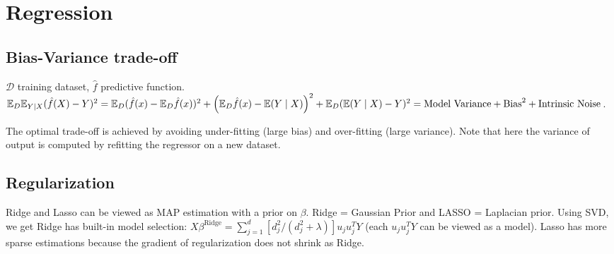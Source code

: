 \section{Regression}

\subsection*{Bias-Variance trade-off}
$\mathcal{D}$ training dataset, $\hat{f}$ predictive function.
$ \mathbb{E}_D \mathbb{E}_{Y\mid X} (\hat{f}(X)-Y)^2 = \mathbb{E}_D (\hat{f}(x)-\mathbb{E}_D \hat{f}(x))^2 + \left(\mathbb{E}_D \hat{f}(x)-\mathbb{E}(Y\mid X)\right)^2 + \mathbb{E}_D (\mathbb{E}(Y\mid X)-Y)^2 = \text{Model Variance} + \text{Bias}^2 + \text{Intrinsic Noise}$. 

The optimal trade-off is achieved by avoiding under-fitting (large bias) and over-fitting (large variance). Note that here the variance of output is computed by refitting the regressor on a new dataset.

\subsection*{Regularization}

Ridge and Lasso can be viewed as MAP estimation with a prior on $\beta$. Ridge = Gaussian Prior and LASSO = Laplacian prior. Using SVD, we get Ridge has built-in model selection:  $X\beta^{\text{Ridge}} = \sum_{j=1}^d [d_j^2 /(d_j^2+\lambda)] u_j u_j^T Y$ (each $u_j u_j^T Y$ can be viewed as a model). Lasso has more sparse estimations because the gradient of regularization does not shrink as Ridge.
